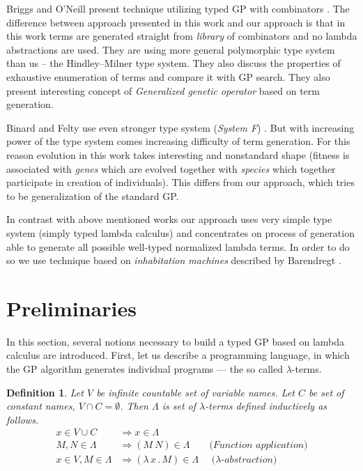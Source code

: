\documentclass{sig-alternate}
\newtheorem{definition}{Definition}
\newcommand{\lets}{let us\xspace}
\newcommand{\lterms}{$\lambda$-terms\xspace}
\newcommand{\then}{\Rightarrow\xspace}
\newcommand{\lamb}[2]{( \lambda \, #1 \, . \, #2 )}
\begin{document}
Briggs and O’Neill present technique 
utilizing typed GP with combinators \cite{kes}.
The difference between approach presented in this work
and our approach is that in this work terms are generated
straight from \textit{library} of combinators and no lambda abstractions
are used. They are using more general polymorphic type system than us
-- the Hindley–Milner type system. They also discuss the 
properties of exhaustive enumeration of terms and compare it with GP search.  
They also present interesting concept of \textit{Generalized
genetic operator} based on term generation. 

Binard and Felty use even 
stronger type system (\textit{System F}) \cite{binard2008genetic}.  
But with increasing power of the type system comes increasing difficulty of term generation.
For this reason evolution in this work takes interesting and nonstandard shape 
(fitness is associated with \textit{genes} which are evolved together with \textit{species}
which together participate in creation of individuals).
This differs from our approach, which tries to be generalization of
the standard GP\cite{koza92}.

In contrast with above mentioned works our approach uses very simple type system 
(simply typed lambda calculus) and concentrates on process of generation  
able to generate all possible well-typed normalized lambda terms. In order to do
so we use technique based on \textit{inhabitation machines} 
described by Barendregt \cite{barendregt10}.    



\section{Preliminaries}
\label{preliminaries}

In this section, several notions necessary to build a typed GP based on lambda calculus are introduced. 
First, \lets describe a programming language, 
in which the GP algorithm generates individual programs --- the so called \lterms.

\begin{definition}
Let $V$ be infinite countable set of {\it 
variable names}. Let $C$ be set of {\it constant names}, 
$V \cap C = \emptyset$.	 	
Then $\Lambda$ is set of {\it \lterms} defined inductively as follows.	
\begin{align*}
x   \in V \cup C  &\then x     \in \Lambda \\
M,N \in \Lambda   &\then (M~N) \in \Lambda 
\textit{~~~~~~(Function application)} \\
x   \in V , M \in \Lambda &\then \lamb{x}{M} \in \Lambda
\textit{~~~~($\lambda$-abstraction)} 
\end{align*}
\end{definition}
\end{document}
